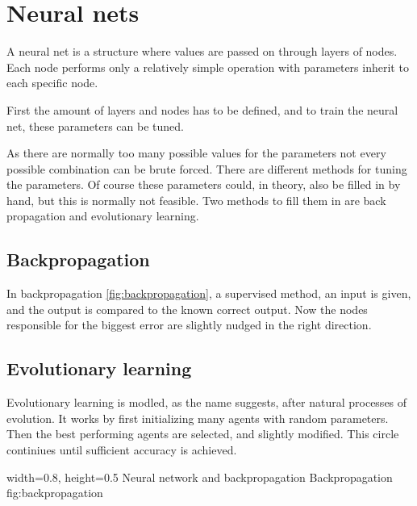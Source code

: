 \section{Neural nets} 
\label{sec:NN}
\cite[p727]{MA}
A neural net is a structure where values are passed on through layers of nodes. Each node performs only a relatively simple operation with parameters inherit to each specific node.

First the amount of layers and nodes has to be defined, and to train the neural net, these parameters can be tuned.

As there are normally too many possible values for the parameters not every possible combination can be brute forced. There are different methods for tuning the parameters. Of course these parameters could, in theory, also be filled in by hand, but this is normally not feasible. Two methods to fill them in are back propagation and evolutionary learning.

\subsection{Backpropagation}
In backpropagation \ref{fig:backpropagation}, a supervised method, an input is given, and the output is compared to the known correct output. Now the nodes responsible for the biggest error are slightly nudged in the right direction. 

\subsection{Evolutionary learning}
Evolutionary learning is modled, as the name suggests, after natural processes of evolution. It works by first initializing many agents with random parameters. Then the best performing agents are selected, and slightly modified. This circle continiues until sufficient accuracy is achieved.

    {width=0.8\textwidth, height=0.5\textheight} %
    {Neural network and backpropagation}   %
    {Backpropagation}   %
    {fig:backpropagation}    %